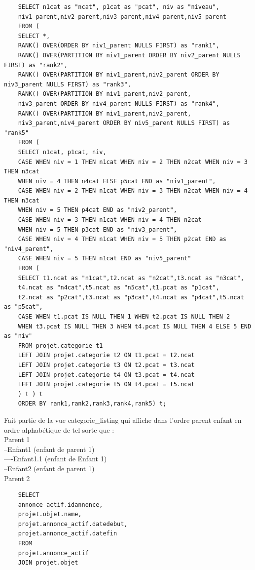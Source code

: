 \documentclass[a4paper,12pt]{article}
\begin{document}
\begin{spacing}{1}
	\begin{verbatim}
	SELECT n1cat as "ncat", p1cat as "pcat", niv as "niveau",
	niv1_parent,niv2_parent,niv3_parent,niv4_parent,niv5_parent
	FROM (
	SELECT *,
	RANK() OVER(ORDER BY niv1_parent NULLS FIRST) as "rank1",
	RANK() OVER(PARTITION BY niv1_parent ORDER BY niv2_parent NULLS FIRST) as "rank2",
	RANK() OVER(PARTITION BY niv1_parent,niv2_parent ORDER BY niv3_parent NULLS FIRST) as "rank3",
	RANK() OVER(PARTITION BY niv1_parent,niv2_parent,
	niv3_parent ORDER BY niv4_parent NULLS FIRST) as "rank4",
	RANK() OVER(PARTITION BY niv1_parent,niv2_parent,
	niv3_parent,niv4_parent ORDER BY niv5_parent NULLS FIRST) as "rank5"
	FROM (
	SELECT n1cat, p1cat, niv,
	CASE WHEN niv = 1 THEN n1cat WHEN niv = 2 THEN n2cat WHEN niv = 3 THEN n3cat 
	WHEN niv = 4 THEN n4cat ELSE p5cat END as "niv1_parent",
	CASE WHEN niv = 2 THEN n1cat WHEN niv = 3 THEN n2cat WHEN niv = 4 THEN n3cat 
	WHEN niv = 5 THEN p4cat END as "niv2_parent",
	CASE WHEN niv = 3 THEN n1cat WHEN niv = 4 THEN n2cat 
	WHEN niv = 5 THEN p3cat END as "niv3_parent",
	CASE WHEN niv = 4 THEN n1cat WHEN niv = 5 THEN p2cat END as "niv4_parent",
	CASE WHEN niv = 5 THEN n1cat END as "niv5_parent"
	FROM (
	SELECT t1.ncat as "n1cat",t2.ncat as "n2cat",t3.ncat as "n3cat",
	t4.ncat as "n4cat",t5.ncat as "n5cat",t1.pcat as "p1cat",
	t2.ncat as "p2cat",t3.ncat as "p3cat",t4.ncat as "p4cat",t5.ncat as "p5cat",
	CASE WHEN t1.pcat IS NULL THEN 1 WHEN t2.pcat IS NULL THEN 2 
	WHEN t3.pcat IS NULL THEN 3 WHEN t4.pcat IS NULL THEN 4 ELSE 5 END as "niv"
	FROM projet.categorie t1
	LEFT JOIN projet.categorie t2 ON t1.pcat = t2.ncat
	LEFT JOIN projet.categorie t3 ON t2.pcat = t3.ncat
	LEFT JOIN projet.categorie t4 ON t3.pcat = t4.ncat
	LEFT JOIN projet.categorie t5 ON t4.pcat = t5.ncat
	) t ) t
	ORDER BY rank1,rank2,rank3,rank4,rank5) t;
	\end{verbatim}
	Fait partie de la vue categorie\_listing qui affiche dans l'ordre parent enfant en ordre alphabétique de tel sorte que :\\
	Parent 1\\
	--Enfant1 (enfant de parent 1)\\
	----Enfant1.1 (enfant de Enfant 1)\\
	--Enfant2 (enfant de parent 1)\\
	Parent 2\\
	\begin{verbatim}
	SELECT 
	annonce_actif.idannonce,
	projet.objet.name, 
	projet.annonce_actif.datedebut,
	projet.annonce_actif.datefin 
	FROM 
	projet.annonce_actif 
	JOIN projet.objet 

\end{verbatim}
\end{spacing}
\end{document}
